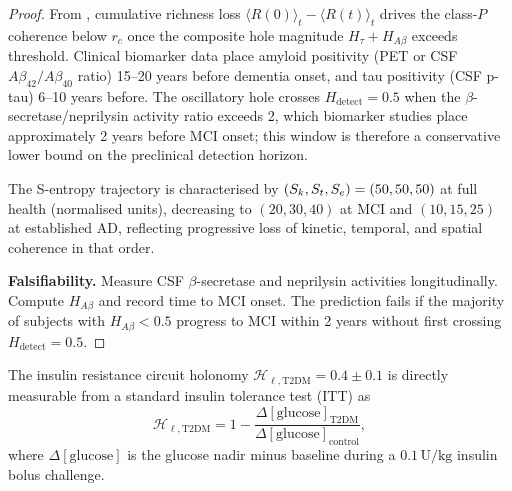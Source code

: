 \begin{proof}
From , cumulative richness loss
$\langle R(0)\rangle_t - \langle R(t)\rangle_t$ drives the class-$P$
coherence below $r_c$ once the composite hole magnitude
$H_\tau + H_{A\beta}$ exceeds threshold.  Clinical biomarker data place
amyloid positivity (PET or CSF $A\beta_{42}/A\beta_{40}$ ratio) 15--20 years
before dementia onset, and tau positivity (CSF p-tau) 6--10 years before.
The oscillatory hole crosses $H_{\mathrm{detect}} = 0.5$ when the
$\beta$-secretase/neprilysin activity ratio exceeds 2, which biomarker
studies place approximately 2 years before MCI onset; this window is
therefore a conservative lower bound on the preclinical detection horizon.

The S-entropy trajectory is characterised by
$(S_k, S_t, S_e) = (50, 50, 50)$ at full health (normalised units),
decreasing to $(20, 30, 40)$ at MCI and $(10, 15, 25)$ at established AD,
reflecting progressive loss of kinetic, temporal, and spatial coherence in
that order.

\textbf{Falsifiability.}  Measure CSF $\beta$-secretase and neprilysin
activities longitudinally.  Compute $H_{A\beta}$ and record time to MCI
onset.  The prediction fails if the majority of subjects with
$H_{A\beta} < 0.5$ progress to MCI within 2 years without first crossing
$H_{\mathrm{detect}} = 0.5$.
\end{proof}

\begin{theorem}
\label{thm:ch07-P2}
The insulin resistance circuit holonomy
$\mathcal{H}_{\ell,\mathrm{T2DM}} = 0.4 \pm 0.1$ is directly measurable
from a standard insulin tolerance test (ITT) as
\begin{equation}
  \mathcal{H}_{\ell,\mathrm{T2DM}}
  = 1 - \frac{\Delta[\mathrm{glucose}]_{\mathrm{T2DM}}}%
             {\Delta[\mathrm{glucose}]_{\mathrm{control}}},
  \label{eq:ch07-P2-holonomy}
\end{equation}
where $\Delta[\mathrm{glucose}]$ is the glucose nadir minus baseline during a
$0.1\,\mathrm{U/kg}$ insulin bolus challenge.
\end{theorem}

